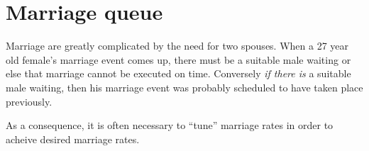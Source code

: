 
\section{Marriage queue}
\label{sec:marriageQueue}

Marriage are greatly complicated by the need for two spouses.  When a
27 year old female's marriage event comes up, there must be a suitable
male waiting or else that marriage cannot be executed on time.
Conversely \emph{if there is} a suitable male waiting, then his
marriage event was probably scheduled to have taken place previously.  

As a consequence, it is often necessary to ``tune'' marriage rates in
order to acheive desired marriage rates.



